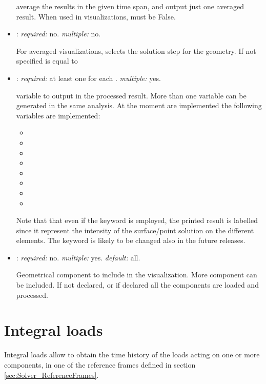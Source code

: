 \begin{itemize}
average the results in the given time span, and output just one averaged result. 
When used in visualizations,  must be False.

\item {}: \textit{required:} no. \textit{multiple:} no.

For averaged visualizations, selects the solution step for the geometry.
If not specified is equal to 

\item {}: \textit{required:} at least one for each . 
\textit{multiple:} yes.

variable to output in the processed result. More than one variable can be generated 
in the same analysis. At the moment are implemented the following variables are implemented: 
\begin{itemize}
  \item {}
  \item {}
  \item {}
  \item {}
  \item {}
  \item {}
  \item {}
  \item {}
\end{itemize} 
Note that that even if the keyword  is employed, the printed result 
is labelled  since it represent the intensity of the 
surface/point solution on the different elements. The keyword is likely to 
be changed also in the future releases.

\item {}: \textit{required:} no. \textit{multiple:} yes. \textit{default:} all.

Geometrical component to include in the visualization. More component can be included. 
If not declared, or if declared  all the components are loaded and processed. 
\end{itemize}

\section{Integral loads}

Integral loads allow to obtain the time history of the loads acting on one 
or more components, in one of the reference frames defined in section 
\ref{sec:Solver_ReferenceFrames}.

